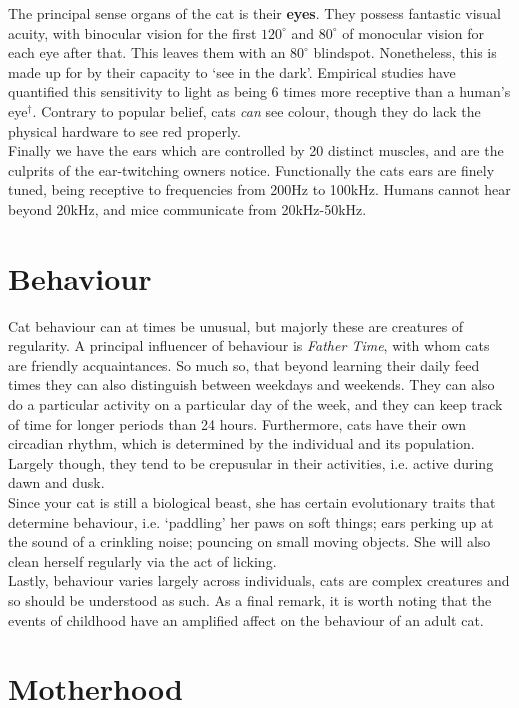 \documentclass{article}
\begin{document}
The principal sense organs of the cat is their \textbf{eyes}. They possess fantastic visual acuity, with binocular vision for the first \(120^\circ\) and \(80^\circ\) of monocular vision for each eye after that. This leaves them with an \(80^\circ\) blindspot. Nonetheless, this is made up for by their capacity to `see in the dark'. Empirical studies have quantified this sensitivity to light as being 6 times more receptive than a human's eye\(^\dagger\). Contrary to popular belief, cats \emph{can} see colour, though they do lack the physical hardware to see red properly.\\

Finally we have the ears which are controlled by 20 distinct muscles, and are the culprits of the ear-twitching owners notice. Functionally the cats ears are finely tuned, being receptive to frequencies from 200Hz to 100kHz. Humans cannot hear beyond 20kHz, and mice communicate from 20kHz-50kHz. 

\section*{Behaviour}
Cat behaviour can at times be unusual, but majorly these are creatures of regularity. A principal influencer of behaviour is \emph{Father Time}, with whom cats are friendly acquaintances. So much so, that beyond learning their daily feed times they can also distinguish between weekdays and weekends. They can also do a particular activity on a particular day of the week, and they can keep track of time for longer periods than 24 hours. Furthermore, cats have their own circadian rhythm, which is determined by the individual and its population. Largely though, they tend to be crepusular in their activities, i.e. active during dawn and dusk.\\

Since your cat is still a biological beast, she has certain evolutionary traits that determine behaviour, i.e. `paddling' her paws on soft things; ears perking up at the sound of a crinkling noise; pouncing on small moving objects. She will also clean herself regularly via the act of licking.\\

Lastly, behaviour varies largely across individuals, cats are complex creatures and so should be understood as such. As a final remark, it is worth noting that the events of childhood have an amplified affect on the behaviour of an adult cat.

\section*{Motherhood}
\end{document}
